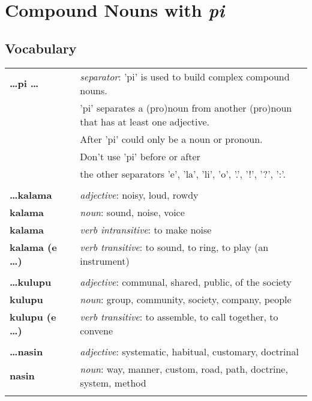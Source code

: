 \section{Compound Nouns with \textit{pi}}
%
\subsection*{Vocabulary}
%
\begin{supertabular}{p{2,5cm}|ll}
\textbf{\dots pi \dots } && \textit{separator}: 'pi' is used to build complex compound nouns. \\ && 'pi' separates a (pro)noun from another (pro)noun that has at least one adjective. \\ && After 'pi' could only be a noun or pronoun. \\ && Don't use 'pi' before or after \\ && the other separators 'e', 'la', 'li', 'o', '.', '!', '?', ':'.  \\ %
 && \\ %
\textbf{\dots kalama} && \textit{adjective}: noisy, loud, rowdy \\ %
\textbf{kalama} && \textit{noun}: sound, noise, voice \\ 
\textbf{kalama} && \textit{verb intransitive}: to make noise \\ %
\textbf{kalama (e \dots)} && \textit{verb transitive}: to sound, to ring, to play (an instrument) \\ %
 && \\ %
\textbf{\dots kulupu} && \textit{adjective}: communal, shared, public, of the society \\ %
\textbf{kulupu} && \textit{noun}: group, community, society, company, people \\ %
\textbf{kulupu (e \dots)} && \textit{verb transitive}: to assemble, to call together, to convene \\ %
 && \\ %
\textbf{\dots nasin} && \textit{adjective}: systematic, habitual, customary, doctrinal \\ %
\textbf{nasin} && \textit{noun}: way, manner, custom, road, path, doctrine, system, method \\ %
 && \\ %
\end{supertabular} \\
%

